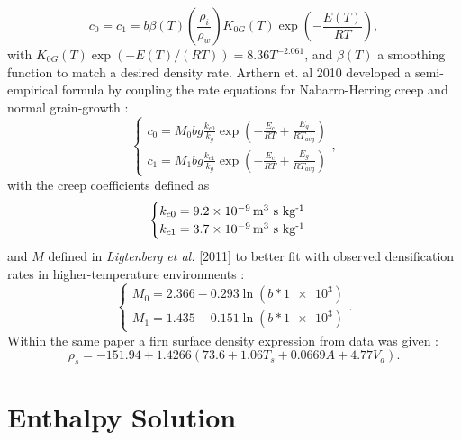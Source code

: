 \documentclass{article}%
\newcommand{\sups}[1]{\ensuremath{^{\textrm{#1}}}}
\begin{document}
  $$
  c_0 = c_1 = 
  b \beta(T)\left(\frac{\rho_i}{\rho_w}\right)
  K_{0G}(T)\exp \left( -\frac{E(T)}{RT} \right),
  $$
with $K_{0G}(T) \exp(-E(T)/(RT)) = 8.36T^{-2.061}$, and $\beta(T)$ a smoothing function to match a desired density rate.  Arthern et. al 2010 developed a semi-empirical formula by coupling the rate equations for Nabarro-Herring creep and normal grain-growth : 
  $$
  \begin{cases}
    c_0 = M_0 bg\frac{k_{c0}}{k_g}\exp\left(-\frac{E_c}{RT} + 
          \frac{E_g}{RT_{avg}}\right)\\
    c_1 = M_1 bg\frac{k_{c1}}{k_g}\exp\left(-\frac{E_c}{RT} + 
          \frac{E_g}{RT_{avg}}\right)
  \end{cases},
  $$
with the creep coefficients defined as
  $$
  \begin{cases}
    k_{c0} = \text{\SI{9.2e-9} m\sups{3} s kg\sups{-1}} \\
    k_{c1} = \text{\SI{3.7e-9} m\sups{3} s kg\sups{-1}}  
  \end{cases}
  $$
and $M$ defined in \emph{Ligtenberg et al.} [2011] to better fit with observed densification rates in higher-temperature environments :
  $$
  \begin{cases}
    M_0 = 2.366 - 0.293\ln(b*\SI{1e3})\\
    M_1 = 1.435 - 0.151\ln(b*\SI{1e3})
  \end{cases}.
  $$
Within the same paper a firn surface density expression from data was given :
  $$ \rho_s = -151.94 + 1.4266(73.6 + 1.06T_s + 0.0669A + 4.77V_a).$$


\section{Enthalpy Solution}
\end{document}
